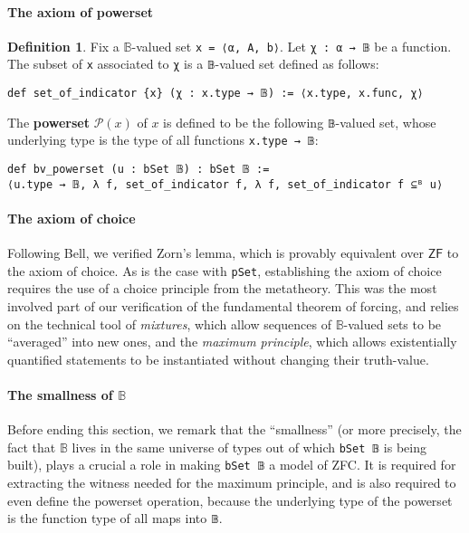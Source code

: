 \documentclass[a4paper,USenglish,cleveref, autoref]{lipics-v2019}
\newcommand{\B}{\mathbb{B}}
\newcommand{\lil}{\lstinline}
\theoremstyle{definition}
\newtheorem{defn}[theorem]{Definition}
\begin{document}
\paragraph*{The axiom of powerset}
\begin{defn}
  Fix a $\B$-valued set \lil{x = ⟨α, A, b⟩}. Let \lil{χ : α → 𝔹} be a function. The subset of \lil{x} associated to \lil{χ} is a \lil{𝔹}-valued set defined as follows:
\begin{lstlisting}
def set_of_indicator {x} (χ : x.type → 𝔹) := ⟨x.type, x.func, χ⟩
\end{lstlisting}

The \textbf{powerset} $\mathcal{P}(x)$ of $x$ is defined to be the following \lil{𝔹}-valued set, whose underlying type is the type of all functions \lil{x.type → 𝔹}:
\begin{lstlisting}
def bv_powerset (u : bSet 𝔹) : bSet 𝔹 :=
⟨u.type → 𝔹, λ f, set_of_indicator f, λ f, set_of_indicator f ⊆ᴮ u⟩
\end{lstlisting}
\end{defn}

\paragraph*{The axiom of choice}
Following Bell, we verified Zorn's lemma, which is provably equivalent over $\mathsf{ZF}$ to the axiom of choice. As is the case with \lil{pSet}, establishing the axiom of choice requires the use of a choice principle from the metatheory. This was the most involved part of our verification of the fundamental theorem of forcing, and relies on the technical tool of \emph{mixtures}, which allow sequences of $\B$-valued sets to be ``averaged'' into new ones, and the \emph{maximum principle}, which allows existentially quantified statements to be instantiated without changing their truth-value.

\paragraph*{The smallness of $\B$}
Before ending this section, we remark that the ``smallness'' (or more precisely, the fact that $\B$ lives in the same universe of types out of which \lil{bSet 𝔹} is being built), plays a crucial a role in making \lstinline{bSet 𝔹} a model of ZFC. It is required for extracting the witness needed for the maximum principle, and is also required to even define the powerset operation, because the underlying type of the powerset is the function type of all maps into \lstinline{𝔹}.
\end{document}
